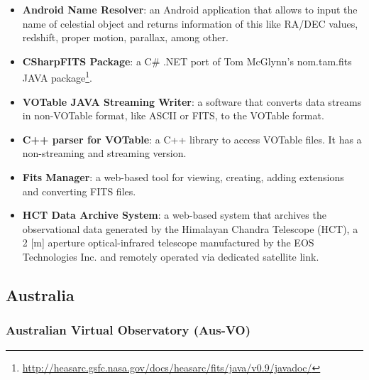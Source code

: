 \begin{itemize}
\item \textbf{Android Name Resolver}:
an Android application that allows to input the name of celestial object and
returns information of this like RA/DEC values, redshift, proper motion,
parallax, among other.

\item \textbf{CSharpFITS Package}:
a C\# .NET port of Tom McGlynn's nom.tam.fits JAVA
package\footnote{\url{http://heasarc.gsfc.nasa.gov/docs/heasarc/fits/java/v0.9/javadoc/}}.

\item \textbf{VOTable JAVA Streaming Writer}:
a software that converts data streams in non-VOTable format, like ASCII or FITS,
to the VOTable format.

\item \textbf{C++ parser for VOTable}:
a C++ library to access VOTable files. It has a non-streaming and streaming
version.

\item \textbf{Fits Manager}:
a web-based tool for viewing, creating, adding extensions and converting FITS
files.

\item \textbf{HCT Data Archive System}:
a web-based system that archives the observational data generated by the
Himalayan Chandra Telescope (HCT), a 2 [m] aperture optical-infrared telescope
manufactured by the EOS Technologies Inc. and remotely operated via dedicated
satellite link.
\end{itemize}

\subsection{Australia}
\subsubsection{Australian Virtual Observatory (Aus-VO)}

